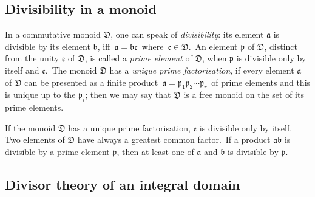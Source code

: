 \documentclass[12pt]{article}
\theoremstyle{definition}
\begin{document}
\subsection{Divisibility in a monoid}

In a commutative monoid $\mathfrak{D}$, one can speak of {\em divisibility}: its element $\mathfrak{a}$ is divisible by its element $\mathfrak{b}$, iff \,$\mathfrak{a = bc}$\, where\, $\mathfrak{c} \in \mathfrak{D}$.\, An element $\mathfrak{p}$ of $\mathfrak{D}$, distinct from the unity $\mathfrak{e}$ of $\mathfrak{D}$, is called a {\em prime element} of $\mathfrak{D}$, when $\mathfrak{p}$ is divisible only by itself and $\mathfrak{e}$.\, The monoid $\mathfrak{D}$ has a {\em unique prime factorisation}, if every element $\mathfrak{a}$ of $\mathfrak{D}$ can be presented as a finite product \,$\mathfrak{a = p}_1\mathfrak{p}_2\cdots\mathfrak{p}_r$\, of prime elements and this  is unique up to the  $\mathfrak{p}_i$; then we may say that $\mathfrak{D}$ is a free monoid on the set of its prime elements.

If the monoid $\mathfrak{D}$ has a unique prime factorisation, $\mathfrak{e}$ is divisible only by itself.\, Two elements of $\mathfrak{D}$ have always a greatest common factor.\, If a product $\mathfrak{ab}$  is divisible by a prime element $\mathfrak{p}$, then at least one of $\mathfrak{a}$ and $\mathfrak{b}$ is divisible by $\mathfrak{p}$.

\subsection{Divisor theory of an integral domain}
\end{document}
